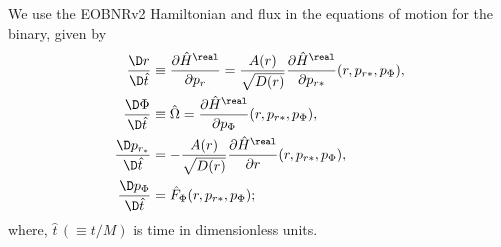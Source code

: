 We use the EOBNRv2 Hamiltonian and flux in the equations of motion for the
binary, given by
\begin{subequations}\label{eq:EOBHamiltonianEqs}	
 \begin{align}
\dfrac{\D r}{\D\hat{t}} &\equiv \dfrac{\partial \hat{H}^{\real}}{\partial p_r} = \dfrac{A(r)}{\sqrt{D(r)}}\dfrac{\partial \hat{H}^{\real}}{\partial p_{r*}} (r, p_{r*}, p_{\Phi}) ,\\
\dfrac{\D\Phi}{\D\hat{t}} &\equiv \hat{\Omega} = \dfrac{\partial \hat{H}^{\real}}{\partial p_{\Phi}} (r, p_{r*}, p_{\Phi}) , \\ 
\dfrac{\D p_{r_*}}{\D\hat{t}} &= -\dfrac{A(r)}{\sqrt{D(r)}} \dfrac{\partial \hat{H}^{\real}}{\partial r} (r, p_{r*}, p_{\Phi}) ,\\
\dfrac{\D p_{\Phi}}{\D\hat{t}} &= \hat{F}_{\Phi}(r, p_{r*}, p_{\Phi}) ;
  \end{align}
\end{subequations}
where, $\hat{t}\,(\equiv t/M)$ is time in dimensionless units. 

